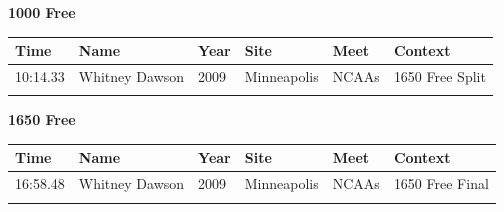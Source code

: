 \vspace{1.2em}
\noindent\begin{minipage}[t]{0.98\textwidth}
\centering
\textbf{\textcolor{teamprimary}{1000 Free}}\par
\vspace{0.5em}
\centering
\small
\renewcommand{\arraystretch}{1.0}
\setlength{\tabcolsep}{4pt}
\begin{tabular}{@{}p{2.0cm}p{3.2cm}p{1.2cm}p{2.0cm}p{2.0cm}p{2.5cm}@{}}
\toprule
\textbf{Time} & \textbf{Name} & \textbf{Year} & \textbf{Site} & \textbf{Meet} & \textbf{Context} \\
\midrule
10:14.33 & Whitney Dawson & 2009 & Minneapolis & NCAAs & 1650 Free Split \\
\bottomrule
\vspace{0.5em}
\end{tabular}
\end{minipage}
\vspace{1.2em}
\noindent\begin{minipage}[t]{0.98\textwidth}
\centering
\textbf{\textcolor{teamprimary}{1650 Free}}\par
\vspace{0.5em}
\centering
\small
\renewcommand{\arraystretch}{1.0}
\setlength{\tabcolsep}{4pt}
\begin{tabular}{@{}p{2.0cm}p{3.2cm}p{1.2cm}p{2.0cm}p{2.0cm}p{2.5cm}@{}}
\toprule
\textbf{Time} & \textbf{Name} & \textbf{Year} & \textbf{Site} & \textbf{Meet} & \textbf{Context} \\
\midrule
16:58.48 & Whitney Dawson & 2009 & Minneapolis & NCAAs & 1650 Free Final \\
\bottomrule
\vspace{0.5em}
\end{tabular}
\end{minipage}
\vspace{1.2em}
